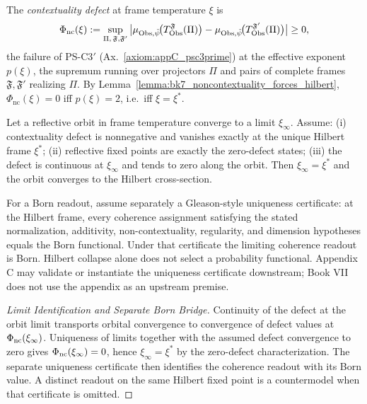 \begin{definition}
\label{definition:bk7_contextuality_defect}
The \emph{contextuality defect} at frame temperature $\xi$ is
\[
\Phi_{\mathrm{nc}}(\xi) := \sup_{\Pi,\,\mathfrak{F},\mathfrak{F}'}
\big| \mu_{\mathrm{Obs},\tilde\psi}\!\big(T^{\mathfrak{F}}_{\mathrm{Obs}}(\Pi)\big)
- \mu_{\mathrm{Obs},\tilde\psi}\!\big(T^{\mathfrak{F}'}_{\mathrm{Obs}}(\Pi)\big) \big| \ge 0,
\]
the failure of PS-C3$'$ (Ax.~\ref{axiom:appC_psc3prime}) at the effective exponent
$p(\xi)$, the supremum running over projectors $\Pi$ and pairs of complete frames
$\mathfrak{F},\mathfrak{F}'$ realizing $\Pi$. By
Lemma~\ref{lemma:bk7_noncontextuality_forces_hilbert}, $\Phi_{\mathrm{nc}}(\xi)=0$ iff
$p(\xi)=2$, i.e.\ iff $\xi=\xi^{\ast}$.
\end{definition}

\begin{theorem}
\label{theorem:bk7_born_collapse}
Let a reflective orbit in frame temperature converge to a limit $\xi_\infty$.
Assume: (i) contextuality defect is nonnegative and vanishes exactly at the
unique Hilbert frame $\xi^*$; (ii) reflective fixed points are exactly the
zero-defect states; (iii) the defect is continuous at $\xi_\infty$ and tends
to zero along the orbit.  Then $\xi_\infty=\xi^*$ and the orbit converges to
the Hilbert cross-section.

For a Born readout, assume separately a Gleason-style uniqueness certificate:
at the Hilbert frame, every coherence assignment satisfying the stated
normalization, additivity, non-contextuality, regularity, and dimension
hypotheses equals the Born functional.  Under that certificate the limiting
coherence readout is Born.  Hilbert collapse alone does not select a
probability functional.  Appendix C may validate or instantiate the uniqueness
certificate downstream; Book VII does not use the appendix as an upstream
premise.
\end{theorem}

\begin{proof}[Limit Identification and Separate Born Bridge]
\label{proof:bk7_born_collapse}
\leavevmode
Continuity of the defect at the orbit limit transports orbital convergence to
convergence of defect values at $\Phi_{\rm nc}(\xi_\infty)$.  Uniqueness of
limits together with the assumed defect convergence to zero gives
$\Phi_{\rm nc}(\xi_\infty)=0$, hence $\xi_\infty=\xi^*$ by the zero-defect
characterization.  The separate uniqueness certificate then identifies the
coherence readout with its Born value.  A distinct readout on the same Hilbert
fixed point is a countermodel when that certificate is omitted.
\end{proof}

